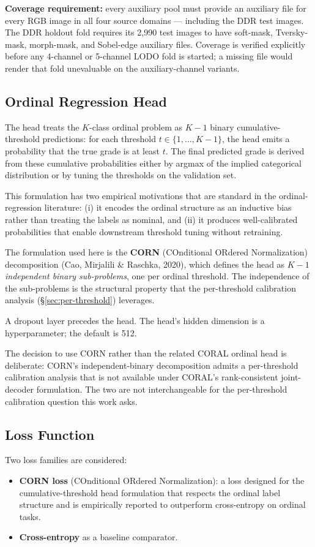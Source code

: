 \documentclass[11pt]{article}
\begin{document}
\textbf{Coverage requirement:} every auxiliary pool must provide an auxiliary file for every RGB image in all four source domains --- including the DDR test images. The DDR holdout fold requires its 2,990 test images to have soft-mask, Tversky-mask, morph-mask, and Sobel-edge auxiliary files. Coverage is verified explicitly before any 4-channel or 5-channel LODO fold is started; a missing file would render that fold unevaluable on the auxiliary-channel variants.

\subsection{Ordinal Regression Head}
\label{sec:head}
The head treats the $K$-class ordinal problem as $K-1$ binary cumulative-threshold predictions: for each threshold $t \in \{1, \dots, K-1\}$, the head emits a probability that the true grade is at least $t$. The final predicted grade is derived from these cumulative probabilities either by argmax of the implied categorical distribution or by tuning the thresholds on the validation set.

This formulation has two empirical motivations that are standard in the ordinal-regression literature: (i) it encodes the ordinal structure as an inductive bias rather than treating the labels as nominal, and (ii) it produces well-calibrated probabilities that enable downstream threshold tuning without retraining.

The formulation used here is the \textbf{CORN} (COnditional ORdered Normalization) decomposition (Cao, Mirjalili \& Raschka, 2020), which defines the head as $K-1$ \emph{independent binary sub-problems}, one per ordinal threshold. The independence of the sub-problems is the structural property that the per-threshold calibration analysis (\S\ref{sec:per-threshold}) leverages.

A dropout layer precedes the head. The head's hidden dimension is a hyperparameter; the default is 512.

The decision to use CORN rather than the related CORAL ordinal head is deliberate: CORN's independent-binary decomposition admits a per-threshold calibration analysis that is not available under CORAL's rank-consistent joint-decoder formulation. The two are not interchangeable for the per-threshold calibration question this work asks.

\subsection{Loss Function}
\label{sec:loss}
Two loss families are considered:
\begin{itemize}[leftmargin=*, topsep=0pt]
  \item \textbf{CORN loss} (COnditional ORdered Normalization): a loss designed for the cumulative-threshold head formulation that respects the ordinal label structure and is empirically reported to outperform cross-entropy on ordinal tasks.
  \item \textbf{Cross-entropy} as a baseline comparator.
\end{itemize}
\end{document}
